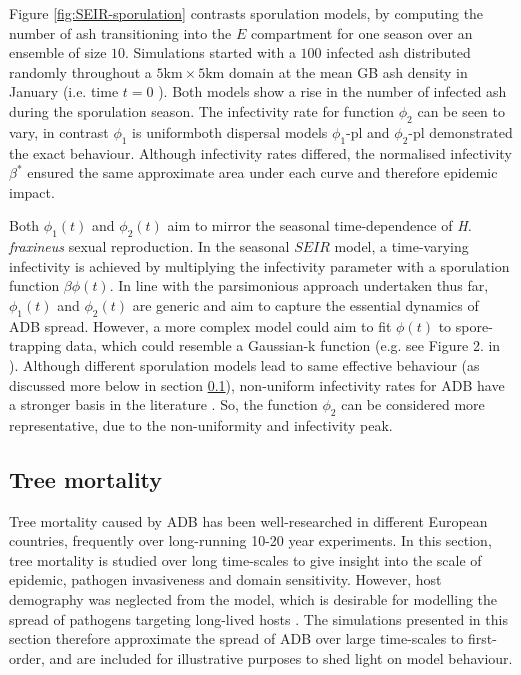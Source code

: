 Figure \ref{fig:SEIR-sporulation} contrasts sporulation models, by computing the number of ash transitioning into the $E$ compartment for one season over an ensemble of size $10$.
Simulations started with a $100$ infected ash distributed randomly throughout a $\mathrm{5km \times 5km}$ domain at the mean GB ash density in January (i.e. time $t=0$ ).
Both models show a rise in the number of infected ash during the sporulation season.
The infectivity rate for function $\phi_2$ can be seen to vary, in contrast $\phi_1$ is uniform\textemdash both dispersal models $\phi_1$-pl and $\phi_2$-pl demonstrated the exact behaviour.
Although infectivity rates differed, the normalised infectivity $\beta^*$ ensured the same approximate area under each curve and therefore epidemic impact.

Both $\phi_1(t)$ and $\phi_2(t)$ aim to mirror the seasonal time-dependence of \textit{H. fraxineus} sexual reproduction.
In the seasonal $SEIR$ model, a time-varying infectivity is achieved by multiplying the infectivity parameter with a sporulation function $\beta\phi(t)$.
In line with the parsimonious approach undertaken thus far, $\phi_1(t)$ and $\phi_2(t)$ are generic and aim to capture the essential dynamics of ADB spread.
However, a more complex model could aim to fit $\phi(t)$ to spore-trapping data, which could resemble a Gaussian-k function (e.g. see Figure 2. in \cite{grosdidier2018tracking}).
Although different sporulation models lead to same effective behaviour (as discussed more below in section \ref{sec:tree-mortality}), 
non-uniform infectivity rates for ADB have a stronger basis in the literature \cite{grosdidier2018tracking, time-varying-infectivity, hietala2013invasive, segarra2001epidemic}.
So, the function $\phi_2$ can be considered more representative, due to the non-uniformity and infectivity peak.

\subsection{Tree mortality}
\label{sec:tree-mortality}

Tree mortality caused by ADB has been well-researched in different European countries, frequently over long-running 10-20 year experiments.
In this section, tree mortality is studied over long time-scales to give insight into the scale of epidemic, pathogen invasiveness and domain sensitivity.
However, host demography was neglected from the model, which is desirable for modelling the spread of pathogens targeting long-lived hosts \cite{doi:10.1098/rstb.1996.0059}.
The simulations presented in this section therefore approximate the spread of ADB over large time-scales to first-order, 
and are included for illustrative purposes to shed light on model behaviour.

